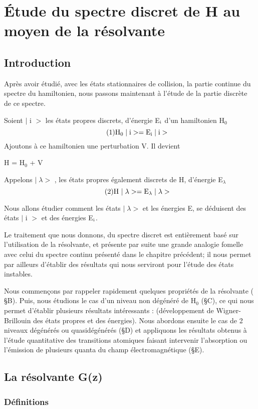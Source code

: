 \chapter{Étude du spectre discret de H au moyen de la résolvante}
\section{Introduction}
Après avoir étudié, avec les états stationnaires de collision, la
partie continue du spectre du hamiltonien, nous passons maintenant à l'étude
de la partie discrète de ce spectre.

Soient $|$ i $>$ les états propres discrets, d'énergie E$_{\text{i}}$ d'un hamiltonien H$_0$
\[
\tag{1}\text{H}_0\;|\;\text{i}>=\text{E}_{\text{i}}\;|\;\text{i}>
\]
Ajoutons à ce hamiltonien une perturbation V. Il devient
\begin{center}
H = H$_0$ + V
\end{center}
Appelons $|\;\lambda>$ , les états propres également discrets de H, d'énergie E$_\lambda$
\[
\tag{2}\text{H }|\;\lambda>=\text{E}_\lambda\;|\;\lambda>
\]

Nous allons étudier comment les états $|\;\lambda>$ et les énergies E, se déduisent des
états $|$ i $>$ et des énergies E$_{\text{i}}$.

Le traitement que nous donnons, du spectre discret est entièrement basé
sur l'utilisation de la résolvante, et présente par suite une grande analogie fomelle
avec celui du spectre continu présenté dans le chapitre précédent; il nous
permet par ailleurs d'établir des résultats qui nous serviront pour l'étude des
états instables.

Nous commençons par rappeler rapidement quelques propriétés de la résolvante ( \S B). Puis, nous étudions le cas d'un niveau non dégénéré de H$_0$ (\S C), ce qui
nous permet d'établir plusieurs résultats intéressants : (développement de Wigner-Brillouin des états propres et des énergies). Nous abordons ensuite le cas de 2
niveaux dégénérés ou quasidégénérés (\S D) et appliquons les résultats obtenus à
l'étude quantitative des transitions atomiques faisant intervenir l'absorption ou
l'émission de plusieurs quanta du champ électromagnétique (\S E).

\section{La résolvante G(z)}%
\subsection{Définitions}%

